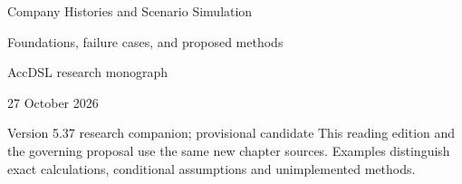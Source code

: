 \documentclass[11pt,a4paper]{report}
\begin{document}
\hypersetup{pageanchor=false}
\begin{titlepage}
{\Huge Company Histories and Scenario Simulation\par}
\vspace{12mm}
{\Large Foundations, failure cases, and proposed methods\par}
\vspace{8mm}
AccDSL research monograph\par 27 October 2026\par Version 5.37 research companion; provisional candidate
\vfill
This reading edition and the governing proposal use the same new chapter sources. Examples distinguish exact calculations, conditional assumptions and unimplemented methods.
\end{titlepage}
\hypersetup{pageanchor=true}
\tableofcontents
\clearpage{}


























\clearpage\label{sim:body-end}

\begingroup\raggedright
\endgroup
\end{document}
